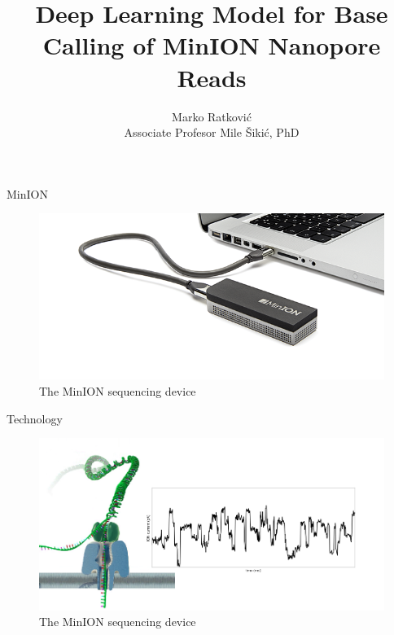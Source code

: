 \documentclass[10pt]{beamer}
\title{Deep Learning Model for Base Calling of MinION Nanopore Reads}
\date{}
\author{Marko Ratković\\
Associate Profesor Mile Šikić, PhD}
\institute{University of Zagreb\\ Faculty of Electrical Engineering and Computing}
\begin{document}
\maketitle



\begin{frame}[fragile]{MinION}
	\begin{figure}
		\begin{center}
			\includegraphics[width=1\textwidth]{imgs/minion.png}%
		    \caption{The MinION sequencing device}
		\end{center}
	\end{figure}
\end{frame}


\begin{frame}[fragile]{Technology}
	\begin{figure}
		
		\begin{center}
			\includegraphics[width=1\textwidth]{imgs/nanopore_no_bases.png}%
			\caption{The MinION sequencing device}
		\end{center}
	\end{figure}
\end{frame}
\end{document}
